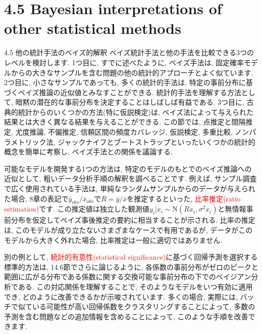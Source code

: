 \documentclass[10pt,dvipdfmx,a4]{beamer}
\newcommand{\tcr}[1]{\textcolor{red}{#1}}
\begin{document}
\section{4.5 Bayesian interpretations of other statistical methods}
\begin{frame}{4.5 他の統計手法のベイズ的解釈}
ベイズ統計手法と他の手法を比較できる3つのレベルを検討します.
1つ目に, すでに述べたように, ベイズ手法は, 固定確率モデルからの大きなサンプルを含む問題の他の統計的アプローチとよく似ています.
2つ目に, 小さなサンプルであっても, 多くの統計的手法は, 特定の事前分布に基づくベイズ推論の近似値とみなすことができる.
統計的手法を理解する方法として, 暗黙の潜在的な事前分布を決定することはしばしば有益である.
3つ目に, 古典的統計からのいくつかの方法(特に仮説検定)は, ベイズ法によって与えられた結果とは大きく異なる結果を与えることができる.
この節では, 点推定と間隔推定, 尤度推論, 不偏推定, 信頼区間の頻度カバレッジ, 仮説検定, 多重比較, ノンパラメトリック法, ジャックナイフとブートストラップといったいくつかの統計的概念を簡単に考察し, ベイズ手法との関係を議論する.
\end{frame}


\begin{frame}
可能なモデルを開発する1つの方法は, 特定のモデルのもとでのベイズ推論への近似として, 粗いデータ分析手順の解釈を調べることです.
例えば, サンプル調査で広く使用されている手法は, 単純なランダムサンプルからのデータが与えられた場合, 8章の表記で$\bar{y}_{obs}/\bar{x}_{obs}$で$R=\bar{y}/\bar{x}$を推定するといった, \tcr{比率推定(ratio estimation)}です.
この推定値は独立した観測値$y_i|x_i\sim\text{N}(Rx_i, \sigma^2x_i)$と無情報事前分布を仮定してベイズ事後推定の要約に相当することが示される.
比率の推定は, このモデルが成り立たないさまざまなケースで有用であるが, データがこのモデルから大きく外れた場合, 比率推定は一般に適切ではありません.

別の例として, \tcr{統計的有意性(statistical significance)}に基づく回帰予測を選択する標準的方法は, 14.6節でさらに論じるように, 各係数の事前分布がゼロのピークと範囲に広がる分布である係数に関する交換可能な事前分布の下でのベイジアン分析である.
この対応関係を理解することで, そのようなモデルをいつ有効に適用でき, どのように改善できるかが示唆されています.
多くの場合, 実際には, バッチで似ている可能性が高い回帰係数をクラスタリングすることによって, 多数の予測を含む問題などの追加情報を含めることによって, このような手順を改善できます.
\end{frame}
\end{document}
